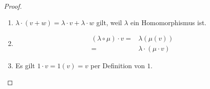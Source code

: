 \begin{proof}
\begin{parts}
\begin{enumerate}[label=(\roman*)]
			 \item $\lambda\cdot (v+w)=\lambda\cdot v+\lambda\cdot w$ gilt, weil $\lambda$ ein Homomorphismus ist.
			 \item 
				 \begin{align*}
					 (\lambda \circ \mu)\cdot v=& \lambda(\mu(v))\\
					 =& \lambda \cdot (\mu\cdot v)
				 \end{align*}
			 \item Es gilt $1\cdot v=1(v)=v$ per Definition von $1$.\qedhere
		\end{enumerate}
	\end{parts}
\end{proof}
